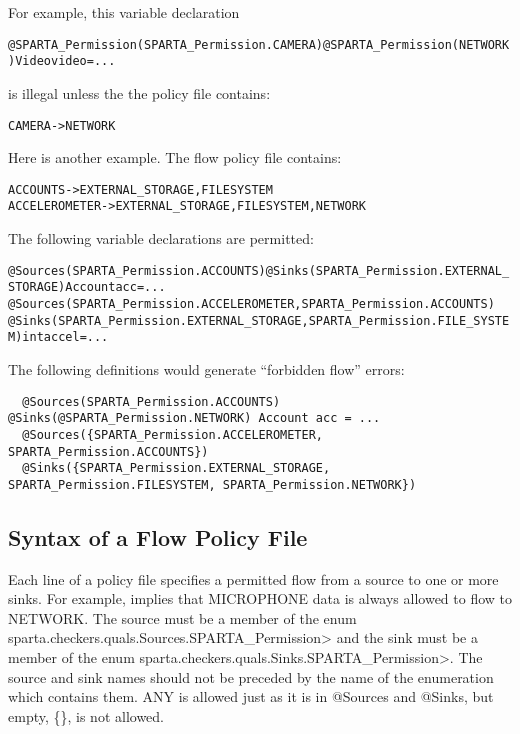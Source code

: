 For example, this variable declaration

\begin{alltt}
@SPARTA_Permission(SPARTA_Permission.CAMERA) @SPARTA_Permission(NETWORK) Video video = ...
\end{alltt}

\noindent
is illegal unless the the policy file contains:

\begin{alltt}
CAMERA -> NETWORK
\end{alltt}

Here is another example.
The flow policy file contains:
\begin{alltt}
  ACCOUNTS      -> EXTERNAL_STORAGE, FILESYSTEM
  ACCELEROMETER -> EXTERNAL_STORAGE, FILESYSTEM, NETWORK
\end{alltt}

The following variable declarations are permitted:
\begin{alltt}
  @Sources(SPARTA_Permission.ACCOUNTS) @Sinks(SPARTA_Permission.EXTERNAL_STORAGE) Account acc = ...
  @Sources({SPARTA_Permission.ACCELEROMETER, SPARTA_Permission.ACCOUNTS})
  @Sinks({SPARTA_Permission.EXTERNAL_STORAGE, SPARTA_Permission.FILE_SYSTEM}) int accel = ...
\end{alltt}

The following definitions would generate ``forbidden flow'' errors:
\begin{Verbatim}
  @Sources(SPARTA_Permission.ACCOUNTS) @Sinks(@SPARTA_Permission.NETWORK) Account acc = ...
  @Sources({SPARTA_Permission.ACCELEROMETER, SPARTA_Permission.ACCOUNTS})
  @Sinks({SPARTA_Permission.EXTERNAL_STORAGE, SPARTA_Permission.FILESYSTEM, SPARTA_Permission.NETWORK})
\end{Verbatim}


\subsection{Syntax of a Flow Policy File}

Each line of a policy file specifies a permitted flow from a source to one
or more sinks.  For example,
 implies that
MICROPHONE data is always allowed to flow to NETWORK.
The source must be a member of the enum
\<sparta.checkers.quals.Sources.SPARTA_Permission> and the sink must be a
member of the enum 
\<sparta.checkers.quals.Sinks.SPARTA_Permission>.  The source 
and sink names should not be preceded by the name of the enumeration which contains them.
ANY is allowed just as it is in @Sources and @Sinks, but empty, \{\}, is not allowed.

